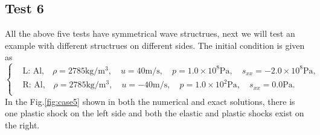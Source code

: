 \documentclass{article}
\numberwithin{equation}{section}
\numberwithin{table}{section}
\begin{document}
\subsection{Test 6}
All the above five tests have symmetrical wave  structrues, next we will test an example with different structrues on different sides. The initial condition is given as
\begin{equation}
 \left\{ \begin{aligned}
&	 \text{L: Al,}\quad  \rho = 2785 \text{kg}/\text{m}^3, \quad  u = 40\text{m}/\text{s}, \quad  p = 1.0\times 10^8\text{Pa}, \quad  s_{xx}=-2.0\times 10^8 \text{Pa},\\
&	 \text{R: Al,}\quad  \rho = 2785 \text{kg}/\text{m}^3, \quad  u = -40\text{m}/\text{s}, \quad  p = 1.0 \times 10^2 \text{Pa}, \quad  s_{xx}=0.0\text{Pa}.\\
   \end{aligned}
 \right.
\end{equation}
In the Fig.\ref{fig:case5} shown in both the numerical and exact solutions, there is one plastic shock on the left side and both the elastic and plastic shocks exist on the right.
\end{document}
